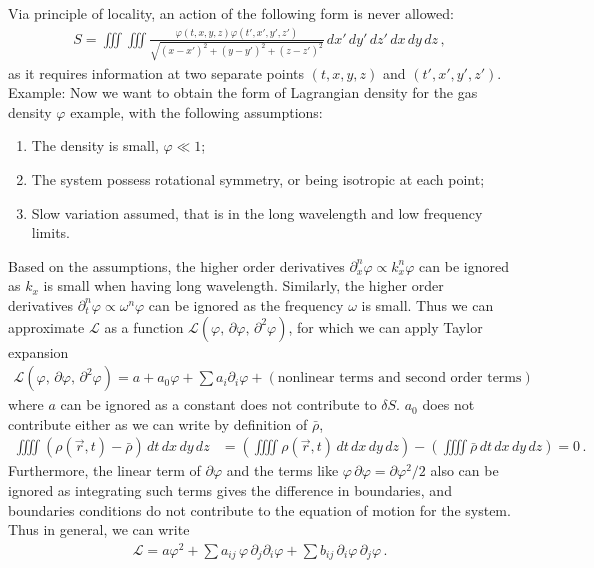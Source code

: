 \documentclass[11pt, onesided]{book}
\theoremstyle{break}
\theoremstyle{break}
\newcommand{\pd}{\partial}
\newcommand{\example}{\color{green}Example: \color{black}}
\begin{document}
Via principle of locality, an action of the following form is never allowed:
\begin{align*}
S = \iiint\iiint \frac{\varphi(t,x,y,z)\varphi(t',x',y',z')}{\sqrt{(x-x')^2 + (y-y')^2 + (z-z')^2}} \,dx'\,dy'\,dz'\, dx\,dy\,dz\,,
\end{align*}
as it requires information at two separate points $(t,x,y,z)$ and $(t',x',y',z')$.\\

\example Now we want to obtain the form of Lagrangian density for the gas density $\varphi$ example, with the following assumptions:
\begin{enumerate}[topsep=3pt,itemsep=-1ex,partopsep=1ex,parsep=1ex]
\item The density is small, $\varphi\ll 1$;
\item The system possess rotational symmetry, or being isotropic at each point; 
\item Slow variation assumed, that is in the long wavelength and low frequency limits.
\end{enumerate}
Based on the assumptions, the higher order derivatives $\pd_x^n \varphi \propto k_x^n \varphi$ can be ignored as $k_x$ is small when having long wavelength. Similarly, the higher order derivatives $\pd_t^n \varphi \propto \omega^n \varphi$ can be ignored as the frequency $\omega$ is small. Thus we can approximate $\mathcal{L}$ as a function $\mathcal{L}(\varphi,\,\pd \varphi,\, \pd^2 \varphi)$, for which we can apply Taylor expansion
\begin{align*}
\mathcal{L}(\varphi,\, \pd \varphi,\, \pd^2 \varphi) =a + a_0 \varphi + \sum a_i \pd_i \varphi + (\text{nonlinear terms and second order terms})
\end{align*}
where $a$ can be ignored as a constant does not contribute to $\delta S$. $a_0$ does not contribute either as we can write by definition of $\bar{\rho}$,
\begin{align*}
\iiiint (\rho(\vec{r},t)- \bar{\rho}) \, dt\,dx\,dy\,dz &=
\left(\iiiint \rho(\vec{r},t) \, dt\,dx\,dy\,dz	\right)-
\left(\iiiint \bar{\rho} \, dt\,dx\,dy\,dz	\right) = 0\,.
\end{align*} 
Furthermore, the linear term of $\pd \varphi$ and the terms like $\varphi\, \pd \varphi = \pd \varphi^2/2$ also can be ignored as integrating such terms gives the difference in boundaries, and boundaries conditions do not contribute to the equation of motion for the system. Thus in general, we can write
\begin{align*}
\mathcal{L} = a\varphi^2 +  \sum a_{ij}\, \varphi\, \pd_j \pd_i \varphi   + \sum b_{ij}\, \pd_i \varphi\, \pd_j \varphi\,.
\end{align*}
\end{document}
